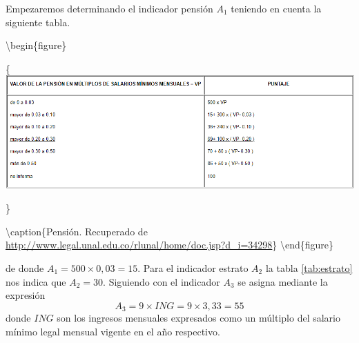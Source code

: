 \documentclass[
]{book}
\begin{document}
Empezaremos determinando el indicador pensión \(A_1\) teniendo en cuenta la siguiente tabla.

\textbackslash{}begin\{figure\}

\{\centering \includegraphics[width=1\linewidth]{ProtectoR/pension}

\}

\textbackslash{}caption\{Pensión. Recuperado de \url{http://www.legal.unal.edu.co/rlunal/home/doc.jsp?d_i=34298}\}\label{fig:unnamed-chunk-14}
\textbackslash{}end\{figure\}

de donde \(A_1=500\times 0,03=15\). Para el indicador estrato \(A_2\) la tabla \ref{tab:estrato} nos indica que \(A_2=30\). Siguiendo con el indicador \(A_3\) se asigna mediante la expresión
\[ A_3=9\times ING=9\times 3,33=55\]
donde \(ING\) son los ingresos mensuales expresados como un múltiplo del salario mínimo legal mensual vigente en el año respectivo.
\end{document}
